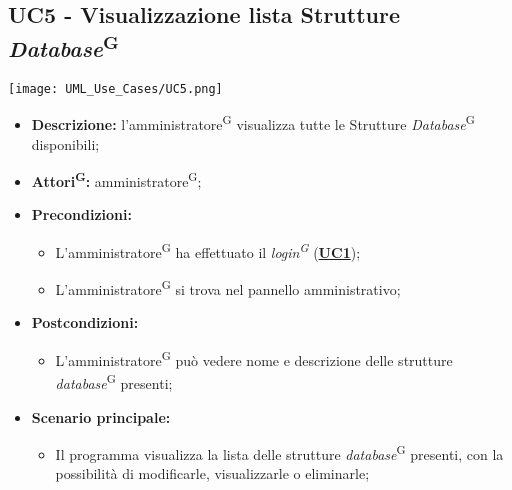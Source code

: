 \subsection{UC5 - Visualizzazione lista Strutture \textit{Database}\textsuperscript{G}}
\label{sec:UC5}
\texttt{[image: UML\_Use\_Cases/UC5.png]}
\begin{itemize}
	\item \textbf{Descrizione:} l’amministratore\textsuperscript{G} visualizza tutte le Strutture \textit{Database}\textsuperscript{G} disponibili;
	\item \textbf{Attori\textsuperscript{G}:} amministratore\textsuperscript{G};
	\item \textbf{Precondizioni:} 
	\begin{itemize}
		\item L’amministratore\textsuperscript{G} ha effettuato il \textit{login\textsuperscript{G}} (\hyperref[sec:UC1]{\textbf{UC1}});
		\item L’amministratore\textsuperscript{G} si trova nel pannello amministrativo;
	\end{itemize}
	\item \textbf{Postcondizioni:} 
	\begin{itemize}
		\item L'amministratore\textsuperscript{G} può vedere nome e descrizione delle strutture \textit{database}\textsuperscript{G} presenti;
	\end{itemize}
	\item \textbf{Scenario principale:} 
	\begin{itemize}
		\item Il programma visualizza la lista delle strutture \textit{database}\textsuperscript{G} presenti, con la possibilità di modificarle, visualizzarle o eliminarle;
	\end{itemize}
\end{itemize}

